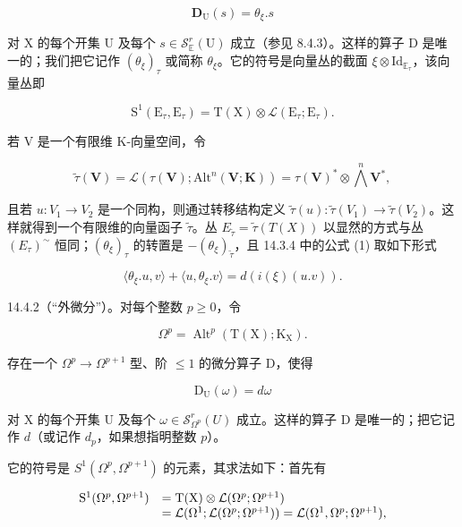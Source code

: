 \[
\mathbf {D} _ {\mathrm{U}} (s) = \theta_ {\xi}. s
\]

对 X 的每个开集 U 及每个 \(s \in \mathcal{S}_{\mathbb{E}}^{r}(\mathrm{U})\) 成立（参见 8.4.3）。这样的算子 D 是唯一的；我们把它记作 \((\theta_{\xi})_{\tau}\) 或简称 \(\theta_{\xi}\)。它的符号是向量丛的截面 \(\xi \otimes \mathrm{Id}_{\mathbb{E}_{\tau}}\)，该向量丛即

\[
\mathrm{S} ^ {1} (\mathrm{E} _ {\tau}, \mathrm{E} _ {\tau}) = \mathrm{T} (\mathrm{X}) \otimes \mathscr {L} (\mathrm{E} _ {\tau}; \mathrm{E} _ {\tau}).
\]

若 V 是一个有限维 K-向量空间，令

\[
\tilde {\tau} (\mathbf {V}) = \mathscr {L} (\tau (\mathbf {V}); \mathrm{Alt} ^ {n} (\mathbf {V}; \mathbf {K})) = \tau (\mathbf {V}) ^ {*} \otimes \bigwedge^ {n} \mathbf {V} ^ {*},
\]

且若 \(u\colon V_{1}\to V_{2}\) 是一个同构，则通过转移结构定义 \(\tilde{\tau}(u)\colon\tilde{\tau}(V_{1})\to\tilde{\tau}(V_{2})\)。这样就得到一个有限维的向量函子 \(\tilde{\tau}\)。丛 \(E_{\tilde{\tau}}=\tilde{\tau}(T(X))\) 以显然的方式与丛 \((E_{\tau})^{\sim}\) 恒同；\((\theta_{\xi})_{\tau}\) 的转置是 \(-( \theta_{\xi})_{\tilde{\tau}}\)，且 14.3.4 中的公式 (1) 取如下形式

\[
\langle \theta_ {\xi}. u, v \rangle + \langle u, \theta_ {\xi}. v \rangle = d (i (\xi) (u. v)).
\]

14.4.2（“外微分”）。对每个整数 \(p \geqslant 0\)，令

\[
\Omega^ {p} = \operatorname{Alt} ^ {p} (\mathrm{T} (\mathrm{X}); \mathrm{K} _ {\mathrm{X}}).
\]

存在一个 \(\Omega^{p} \to \Omega^{p+1}\) 型、阶 \(\leqslant 1\) 的微分算子 D，使得

\[
\mathrm{D} _ {\mathrm{U}} (\omega) = d \omega
\]

对 X 的每个开集 U 及每个 \(\omega\in\mathcal{S}_{\Omega^{p}}^{r}(U)\) 成立。这样的算子 D 是唯一的；把它记作 \(d\)（或记作 \(d_{p}\)，如果想指明整数 \(p\)）。

它的符号是 \(S^1(\Omega^p, \Omega^{p+1})\) 的元素，其求法如下：首先有

\[
\begin{array}{r l} \mathrm{S} ^ {1} (\Omega^ {p}, \Omega^ {p + 1}) & = \mathrm{T} (\mathrm{X}) \otimes \mathcal {L} (\Omega^ {p}; \Omega^ {p + 1}) \\ & = \mathcal {L} (\Omega^ {1}; \mathcal {L} (\Omega^ {p}; \Omega^ {p + 1})) = \mathcal {L} (\Omega^ {1}, \Omega^ {p}; \Omega^ {p + 1}), \end{array}
\]

